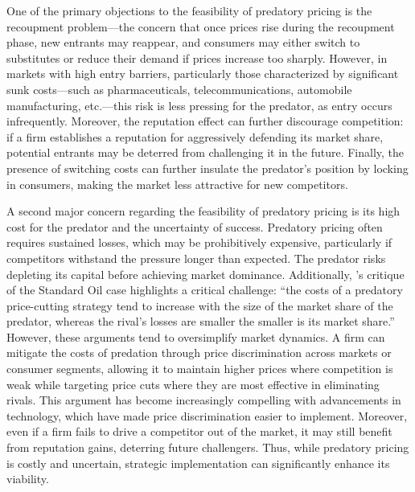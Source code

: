 \documentclass[12pt,oneside]{article}
\theoremstyle{definition}
\theoremstyle{remark}
\begin{document}
One of the primary objections to the feasibility of predatory pricing is the recoupment problem—the concern that once prices rise during the recoupment phase, new entrants may reappear, and consumers may either switch to substitutes or reduce their demand if prices increase too sharply. However, in markets with high entry barriers, particularly those characterized by significant sunk costs—such as pharmaceuticals, telecommunications, automobile manufacturing, etc.—this risk is less pressing for the predator, as entry occurs infrequently. Moreover, the reputation effect can further discourage competition: if a firm establishes a reputation for aggressively defending its market share, potential entrants may be deterred from challenging it in the future. Finally, the presence of switching costs can further insulate the predator's position by locking in consumers, making the market less attractive for new competitors.

A second major concern regarding the feasibility of predatory pricing is its high cost for the predator and the uncertainty of success. Predatory pricing often requires sustained losses, which may be prohibitively expensive, particularly if competitors withstand the pressure longer than expected. The predator risks depleting its capital before achieving market dominance. Additionally, \cite{McGee1958}’s critique of the Standard Oil case highlights a critical challenge: “the costs of a predatory price-cutting strategy tend to increase with the size of the market share of the predator, whereas the rival's losses are smaller the smaller is its market share.” However, these arguments tend to oversimplify market dynamics. A firm can mitigate the costs of predation through price discrimination across markets or consumer segments, allowing it to maintain higher prices where competition is weak while targeting price cuts where they are most effective in eliminating rivals. This argument has become increasingly compelling with advancements in technology, which have made price discrimination easier to implement. Moreover, even if a firm fails to drive a competitor out of the market, it may still benefit from reputation gains, deterring future challengers. Thus, while predatory pricing is costly and uncertain, strategic implementation can significantly enhance its viability.
\end{document}
